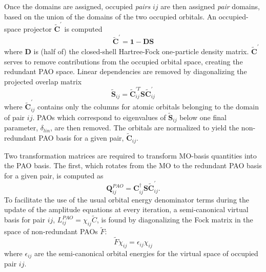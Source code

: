 Once the domains are assigned, occupied \textit{pairs} $ij$ are then assigned \textit{pair} 
domains, based on the union of the domains of the two occupied orbitals. 
An occupied-space projector $\tilde{\textbf{C}}^\prime$ is computed  
\begin{equation}
    \tilde{\textbf{C}}^\prime = \textbf{1} - \textbf{DS}
\end{equation}
where $\textbf{D}$ is (half of) the closed-shell Hartree-Fock one-particle density matrix. 
$\tilde{\textbf{C}}^\prime$ serves to remove contributions from the occupied orbital space, creating
the redundant PAO space. Linear dependencies are removed by diagonalizing the projected 
overlap matrix
\begin{equation}
    \tilde{\textbf{S}}_{ij} = \tilde{\textbf{C}}^{\prime T}_{ij}\textbf{S}\tilde{\textbf{C}}^{\prime}_{ij}
\end{equation}
where $\tilde{\textbf{C}}^\prime_{ij}$ contains only the columns for atomic orbitals belonging to
the domain of pair ${ij}$. PAOs which correspond to eigenvalues of $\tilde{\textbf{S}}_{ij}$ 
below one final parameter, 
$\delta_{lin}$, are then removed.
The orbitals are normalized to yield the non-redundant PAO basis for a given pair, 
$\tilde{\textbf{C}}_{ij}$.

Two transformation matrices are required to transform MO-basis quantities 
into the PAO basis. The first, which rotates from the MO to the redundant PAO
basis for a given pair, is computed as
\begin{equation} \label{eq:Q_pao}
    \textbf{Q}^{PAO}_{ij} = \textbf{C}^{\dagger}_{ij}\textbf{S}\tilde{\textbf{C}}^\prime_{ij}.
\end{equation}
To facilitate the use of the usual orbital energy denominator terms during the update of the 
amplitude equations at every iteration, a semi-canonical virtual basis for pair $ij$,
$L^{PAO}_{ij} = \chi_{ij}\tilde{C}$,
is found by diagonalizing the Fock matrix in the space of non-redundant PAOs $\tilde{F}$:
\begin{equation} \label{eq:L_pao}
    \tilde{F}\chi_{ij} = \epsilon_{ij}\chi_{ij}
\end{equation}
where $\epsilon_{ij}$ are the semi-canonical orbital energies for the virtual space of 
occupied pair $ij$. 

